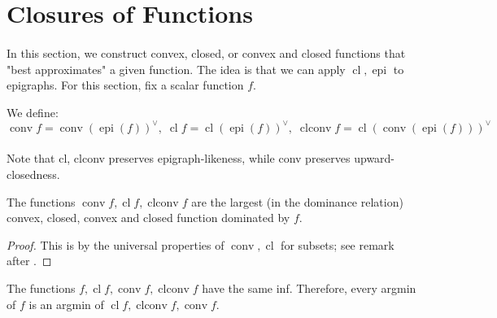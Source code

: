 \section{Closures of Functions}
\label{sect:023}

\paragraph{}In this section, we construct convex, closed, or convex and closed functions that "best approximates" a given function. The idea is that we can apply $\operatorname{cl},\operatorname{epi}$ to epigraphs. For this section, fix a scalar function $f$.

\begin{defn}
	\label{defn:023-closure-funcs}
	We define:
	\[
		\operatorname{conv}f=
		\operatorname{conv}(\operatorname{epi}(f))^\vee,\;
		\operatorname{cl}f=
		\operatorname{cl}(\operatorname{epi}(f))^\vee,\;
		\operatorname{clconv}f=
		\operatorname{cl}(\operatorname{conv} (\operatorname{epi}(f)))^\vee
	\]
\end{defn}
\paragraph{}Note that cl, clconv preserves epigraph-likeness, while conv preserves upward-closedness.

\begin{prop}\label{prop:023-closure-univ}
	The functions $\operatorname{conv}f,\operatorname{cl}f,\operatorname{clconv}f$ are the largest (in the dominance relation) convex, closed, convex and closed function dominated by $f$.
\end{prop}

\begin{proof}
	This is by the universal properties of $\operatorname{conv},\operatorname{cl}$ for subsets; see remark after .
\end{proof}


\begin{prop}[Optimality]
	\label{prop:023-closure-optimality}
	The functions $f,\operatorname{cl}f,\operatorname{conv}f,\operatorname{clconv}f$ have the same inf. Therefore, every argmin of $f$ is an argmin of $\operatorname{cl}f,\operatorname{clconv}f,\operatorname{conv}f$.
\end{prop}

